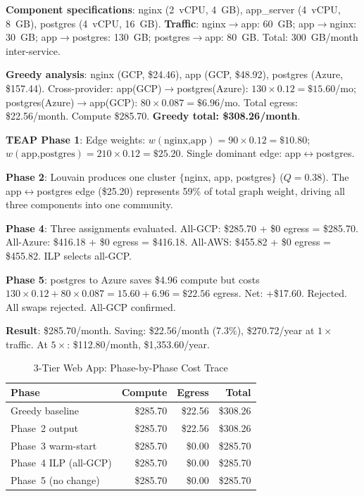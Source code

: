 \documentclass[10pt,journal]{IEEEtran}
\begin{document}
\textbf{Component specifications}: nginx (2~vCPU, 4~GB), app\_server (4~vCPU, 8~GB),
postgres (4~vCPU, 16~GB).
\textbf{Traffic}: nginx$\to$app: 60~GB; app$\to$nginx: 30~GB;
app$\to$postgres: 130~GB; postgres$\to$app: 80~GB.
Total: 300~GB/month inter-service.

\textbf{Greedy analysis}:
nginx (GCP, \$24.46), app (GCP, \$48.92), postgres (Azure, \$157.44).
Cross-provider: app(GCP)$\to$postgres(Azure): $130 \times 0.12 = \$15.60$/mo;
postgres(Azure)$\to$app(GCP): $80 \times 0.087 = \$6.96$/mo.
Total egress: \$22.56/month. Compute \$285.70.
\textbf{Greedy total: \$308.26/month}.

\textbf{TEAP Phase 1}: Edge weights:
$w(\text{nginx,app}) = 90 \times 0.12 = \$10.80$;
$w(\text{app,postgres}) = 210 \times 0.12 = \$25.20$.
Single dominant edge: app$\leftrightarrow$postgres.

\textbf{Phase 2}: Louvain produces one cluster $\{$nginx, app, postgres$\}$ ($Q = 0.38$).
The app$\leftrightarrow$postgres edge (\$25.20) represents 59\% of total graph weight,
driving all three components into one community.

\textbf{Phase 4}: Three assignments evaluated.
All-GCP: \$285.70 + \$0 egress = \$285.70.
All-Azure: \$416.18 + \$0 egress = \$416.18.
All-AWS: \$455.82 + \$0 egress = \$455.82.
ILP selects all-GCP.

\textbf{Phase 5}: postgres to Azure saves \$4.96 compute but costs
$130 \times 0.12 + 80 \times 0.087 = 15.60 + 6.96 = \$22.56$ egress.
Net: +\$17.60. Rejected. All swaps rejected. All-GCP confirmed.

\textbf{Result}: \$285.70/month. Saving: \$22.56/month (7.3\%),
\$270.72/year at $1\times$ traffic. At $5\times$: \$112.80/month, \$1,353.60/year.

\begin{table}[ht]
\centering
\caption{3-Tier Web App: Phase-by-Phase Cost Trace}
\label{tab:3tier_full}
\setlength{\tabcolsep}{4pt}
\begin{tabular}{lrrr}
\toprule
Phase & Compute & Egress & Total\\
\midrule
Greedy baseline         & \$285.70 & \$22.56 & \$308.26\\
Phase~2 output          & \$285.70 & \$22.56 & \$308.26\\
Phase~3 warm-start      & \$285.70 & \$0.00  & \$285.70\\
Phase~4 ILP (all-GCP)   & \$285.70 & \$0.00  & \$285.70\\
Phase~5 (no change)     & \$285.70 & \$0.00  & \$285.70\\
\bottomrule
\end{tabular}
\end{table}
\end{document}
